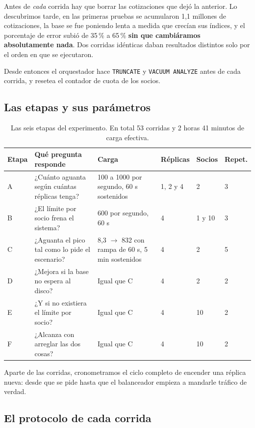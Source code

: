 \documentclass[11pt]{article}
\begin{document}
Antes de \textit{cada} corrida hay que borrar las cotizaciones que dejó la anterior. Lo descubrimos
tarde, en las primeras pruebas se acumularon 1,1 millones de cotizaciones, la base se fue poniendo
lenta a medida que crecían sus índices, y el porcentaje de error subió de 35\,\% a 65\,\%
\textbf{sin que cambiáramos absolutamente nada}. Dos corridas idénticas daban resultados distintos
solo por el orden en que se ejecutaron.

Desde entonces el orquestador hace \texttt{TRUNCATE} y \texttt{VACUUM ANALYZE} antes de cada
corrida, y resetea el contador de cuota de los socios.

\subsection{Las etapas y sus parámetros}

\begin{table}[H]
\centering
\small
\begin{tabular}{L{1.1cm} L{4.8cm} L{4.1cm} L{1.5cm} L{1.3cm} L{1.5cm}}
\toprule
Etapa & Qué pregunta responde & Carga & Réplicas & Socios & Repet. \\
\midrule
A & ¿Cuánto aguanta según cuántas réplicas tenga? & 100 a 1000 por segundo, 60 s sostenidos & 1, 2 y 4 & 2 & 3 \\
B & ¿El límite por socio frena el sistema? & 600 por segundo, 60 s & 4 & 1 y 10 & 3 \\
C & ¿Aguanta el pico tal como lo pide el escenario? & 8,3 $\rightarrow$ 832 con rampa de 60 s, 5 min sostenidos & 4 & 2 & 5 \\
D & ¿Mejora si la base no espera al disco? & Igual que C & 4 & 2 & 2 \\
E & ¿Y si no existiera el límite por socio? & Igual que C & 4 & 10 & 2 \\
F & ¿Alcanza con arreglar las dos cosas? & Igual que C & 4 & 10 & 2 \\
\bottomrule
\end{tabular}
\caption{Las seis etapas del experimento. En total 53 corridas y 2 horas 41 minutos de carga efectiva.}
\end{table}

Aparte de las corridas, cronometramos el ciclo completo de encender una réplica nueva: desde que se
pide hasta que el balanceador empieza a mandarle tráfico de verdad.

\subsection{El protocolo de cada corrida}
\end{document}
